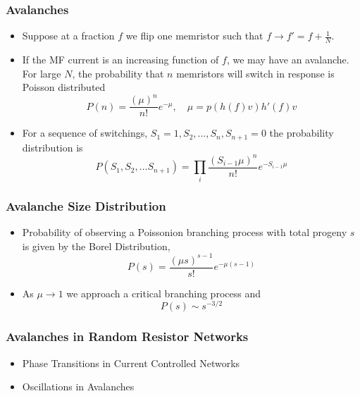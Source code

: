 \documentclass[mathserif]{beamer}
\begin{document}
\begin{frame}
\frametitle{Avalanches}
\begin{itemize}
\item Suppose at a fraction $f$ we flip one memristor such that $f\to f'= f + \frac{1}{N}$.
\item If the MF current is an increasing function of $f$, we may have an avalanche. For large
$N$, the probability that $n$ memristors will switch in response is Poisson distributed
$$P(n) = \frac{(\mu)^n}{n!} e^{-\mu}, \quad \mu = p(h(f)v)h'(f)v$$
\item For a sequence of switchings, $S_1=1, S_2, ...,S_n, S_{n+1}=0$ the
probability distribution is
$$P(S_1, S_2, ...S_{n+1}) = \prod_i  \frac{(S_{i-1}\mu)^n}{n!} e^{-S_{i-1}\mu} $$

\end{itemize}
\end{frame}

\begin{frame}
\frametitle{Avalanche Size Distribution}
\begin{itemize}
\item Probability of observing a Poissonion branching process with total progeny $s$ is given
by the Borel Distribution,
$$P(s) = \frac{(\mu s)^{s-1}}{s!} e^{-\mu(s-1)}$$
\item As $\mu\to 1$ we approach a critical branching process and
$$P(s) \sim s^{-3/2}$$
\end{itemize}
\end{frame}

\begin{frame}
\frametitle{Avalanches in Random Resistor Networks}

\end{frame}

\begin{frame}
\begin{itemize}
\item Phase Transitions in Current Controlled Networks
\item Oscillations in Avalanches
\end{itemize}
\end{frame}
\end{document}
